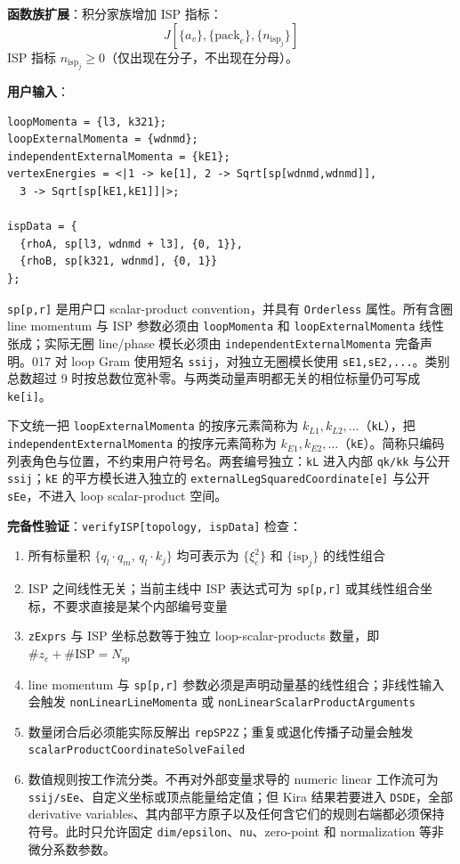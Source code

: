 ﻿\documentclass[a4paper,11pt]{article}
\begin{document}
\textbf{函数族扩展}：积分家族增加 ISP 指标：
\begin{equation}
  J[\{a_v\}, \{\text{pack}_e\}, \{n_{\text{isp}_j}\}]
\end{equation}
ISP 指标 $n_{\text{isp}_j} \geq 0$（仅出现在分子，不出现在分母）。

\textbf{用户输入}：
\begin{verbatim}
loopMomenta = {l3, k321};
loopExternalMomenta = {wdnmd};
independentExternalMomenta = {kE1};
vertexEnergies = <|1 -> ke[1], 2 -> Sqrt[sp[wdnmd,wdnmd]],
  3 -> Sqrt[sp[kE1,kE1]]|>;

ispData = {
  {rhoA, sp[l3, wdnmd + l3], {0, 1}},
  {rhoB, sp[k321, wdnmd], {0, 1}}
};
\end{verbatim}

\texttt{sp[p,r]} 是用户口 scalar-product convention，并具有 \texttt{Orderless} 属性。所有含圈 line momentum 与 ISP 参数必须由 \texttt{loopMomenta} 和 \texttt{loopExternalMomenta} 线性张成；实际无圈 line/phase 模长必须由 \texttt{independentExternalMomenta} 完备声明。017 对 loop Gram 使用短名 \texttt{ssij}，对独立无圈模长使用 \texttt{sE1,sE2,...}。类别总数超过 9 时按总数位宽补零。与两类动量声明都无关的相位标量仍可写成 \texttt{ke[i]}。

下文统一把 \texttt{loopExternalMomenta} 的按序元素简称为 $k_{L1},k_{L2},\ldots$（\texttt{kL}），把 \texttt{independentExternalMomenta} 的按序元素简称为 $k_{E1},k_{E2},\ldots$（\texttt{kE}）。简称只编码列表角色与位置，不约束用户符号名。两套编号独立：\texttt{kL} 进入内部 \texttt{qk/kk} 与公开 \texttt{ssij}；\texttt{kE} 的平方模长进入独立的 \texttt{externalLegSquaredCoordinate[e]} 与公开 \texttt{sEe}，不进入 loop scalar-product 空间。

\textbf{完备性验证}：\texttt{verifyISP[topology, ispData]} 检查：
\begin{enumerate}
  \item 所有标量积 $\{q_l \cdot q_m,\, q_l \cdot k_j\}$ 均可表示为 $\{\xi_e^2\}$ 和 $\{\text{isp}_j\}$ 的线性组合
  \item ISP 之间线性无关；当前主线中 ISP 表达式可为 \texttt{sp[p,r]} 或其线性组合坐标，不要求直接是某个内部编号变量
  \item \texttt{zExprs} 与 ISP 坐标总数等于独立 loop-scalar-products 数量，即 $\# z_e+\#\text{ISP}=N_{\text{sp}}$
  \item line momentum 与 \texttt{sp[p,r]} 参数必须是声明动量基的线性组合；非线性输入会触发 \texttt{nonLinearLineMomenta} 或 \texttt{nonLinearScalarProductArguments}
  \item 数量闭合后必须能实际反解出 \texttt{repSP2Z}；重复或退化传播子动量会触发 \texttt{scalarProductCoordinateSolveFailed}
  \item 数值规则按工作流分类。不再对外部变量求导的 numeric linear 工作流可为 \texttt{ssij/sEe}、自定义坐标或顶点能量给定值；但 Kira 结果若要进入 \texttt{DSDE}，全部 derivative variables、其内部平方原子以及任何含它们的规则右端都必须保持符号。此时只允许固定 \texttt{dim/epsilon}、\texttt{nu}、zero-point 和 normalization 等非微分系数参数。
\end{enumerate}
\end{document}
